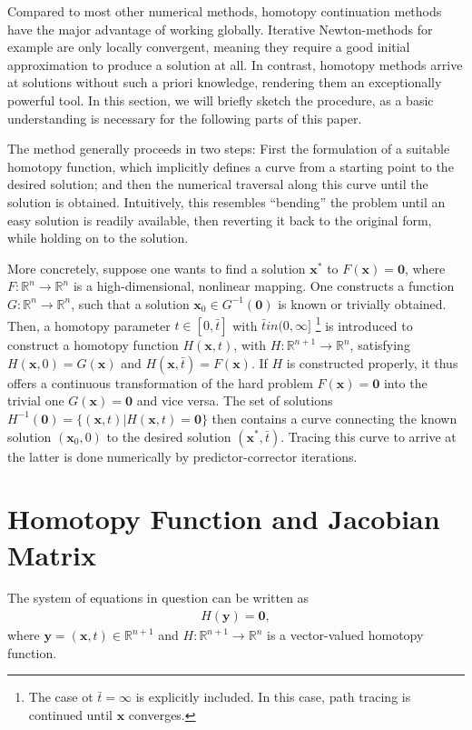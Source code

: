 \documentclass[11pt,fleqn]{article}
\newcommand{\R}{\mathbb{R}}
\begin{document}
Compared to most other numerical methods, homotopy continuation methods have the major advantage of working globally. Iterative Newton-methods for example are only locally convergent, meaning they require a good initial approximation to produce a solution at all. In contrast, homotopy methods arrive at solutions without such a priori knowledge, rendering them an exceptionally powerful tool. In this section, we will briefly sketch the procedure, as a basic understanding is necessary for the following parts of this paper.

The method generally proceeds in two steps: First the formulation of a suitable homotopy function, which implicitly defines a curve from a starting point to the desired solution; and then the numerical traversal along this curve until the solution is obtained. Intuitively, this resembles ``bending'' the problem until an easy solution is readily available, then reverting it back to the original form, while holding on to the solution.

More concretely, suppose one wants to find a solution $\bm{x}^*$ to $F(\bm{x})=\bm{0}$, where $F:\R^n \rightarrow \R^n$ is a high-dimensional, nonlinear mapping. One constructs a function $G:\R^n \rightarrow \R^n$, such that a solution $\bm{x}_0 \in G^{-1}(\bm{0})$ is known or trivially obtained. Then, a homotopy parameter $t \in [0,\bar{t}]$ with $\bar{t} in (0,\infty]$%
\footnote{%
The case ot $\bar{t} = \infty$ is explicitly included. In this case, path tracing is continued until $\bm{x}$ converges.} %
is introduced to construct a homotopy function $H(\bm{x},t)$, with $H:\R^{n+1} \rightarrow \R^n$, satisfying $H(\bm{x},0)=G(\bm{x})$ and $H(\bm{x},\bar{t})=F(\bm{x})$. If $H$ is constructed properly, it thus offers a continuous transformation of the hard problem $F(\bm{x})=\bm{0}$ into the trivial one $G(\bm{x})=\bm{0}$ and vice versa. The set of solutions $H^{-1}(\bm{0})=\{(\bm{x},t)|H(\bm{x},t)=\bm{0}\}$ then contains a curve connecting the known solution $(\bm{x}_0,0)$ to the desired solution $(\bm{x}^*,\bar{t})$. Tracing this curve to arrive at the latter is done numerically by predictor-corrector iterations.




\section{Homotopy Function and Jacobian Matrix}


The system of equations in question can be written as
\begin{align*}
	H(\bm{y}) = \bm{0},
\end{align*}
where $\bm{y} = (\bm{x},t) \in \mathbb{R}^{n+1}$ and $H: \mathbb{R}^{n+1} \rightarrow \mathbb{R}^n$ is a vector-valued homotopy function. 
\end{document}
